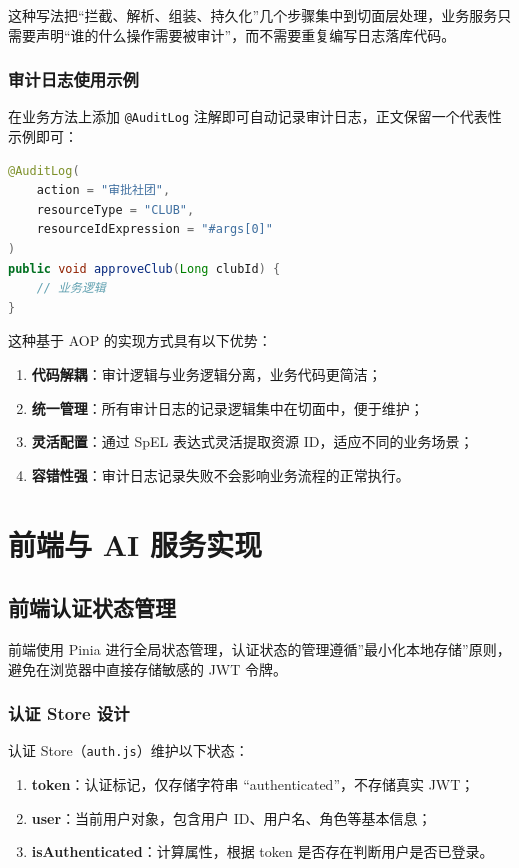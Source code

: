 这种写法把“拦截、解析、组装、持久化”几个步骤集中到切面层处理，业务服务只需要声明“谁的什么操作需要被审计”，而不需要重复编写日志落库代码。

\subsubsection{审计日志使用示例}

在业务方法上添加 \texttt{@AuditLog} 注解即可自动记录审计日志，正文保留一个代表性示例即可：

\begin{lstlisting}[language=Java, caption=审计日志使用示例]
@AuditLog(
    action = "审批社团",
    resourceType = "CLUB",
    resourceIdExpression = "#args[0]"
)
public void approveClub(Long clubId) {
    // 业务逻辑
}
\end{lstlisting}

这种基于 AOP 的实现方式具有以下优势：

\begin{enumerate}
  \item \textbf{代码解耦}：审计逻辑与业务逻辑分离，业务代码更简洁；
  \item \textbf{统一管理}：所有审计日志的记录逻辑集中在切面中，便于维护；
  \item \textbf{灵活配置}：通过 SpEL 表达式灵活提取资源 ID，适应不同的业务场景；
  \item \textbf{容错性强}：审计日志记录失败不会影响业务流程的正常执行。
\end{enumerate}

\section{前端与 AI 服务实现}

\subsection{前端认证状态管理}

前端使用 Pinia 进行全局状态管理，认证状态的管理遵循”最小化本地存储”原则，避免在浏览器中直接存储敏感的 JWT 令牌。

\subsubsection{认证 Store 设计}

认证 Store（\texttt{auth.js}）维护以下状态：

\begin{enumerate}
  \item \textbf{token}：认证标记，仅存储字符串 “authenticated”，不存储真实 JWT；
  \item \textbf{user}：当前用户对象，包含用户 ID、用户名、角色等基本信息；
  \item \textbf{isAuthenticated}：计算属性，根据 token 是否存在判断用户是否已登录。
\end{enumerate}

